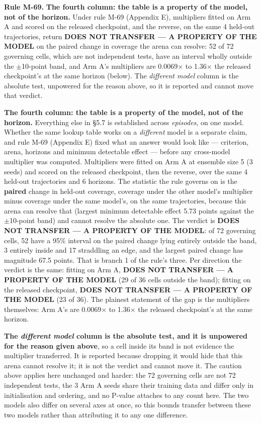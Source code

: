 \documentclass[10pt]{article}
\begin{document}
\textbf{Rule M-69.} \textbf{The fourth column: the table is a property of the model, not of the horizon.} Under rule M-69 (Appendix E), multipliers fitted on Arm A and scored on the released checkpoint, and the reverse, on the same 4 held-out trajectories, return \textbf{DOES NOT TRANSFER --- A PROPERTY OF THE MODEL} on the paired change in coverage the arena can resolve: 52 of 72 governing cells, which are not independent tests, have an interval wholly outside the $\pm$10-point band, and Arm A's multipliers are 0.0069$\times$ to 1.36$\times$ the released checkpoint's at the same horizon (below). The \emph{different model} column is the absolute test, unpowered for the reason above, so it is reported and cannot move that verdict.

\textbf{The fourth column: the table is a property of the model, not of the horizon.} Everything else in \S{}5.7 is established across \emph{episodes}, on one model. Whether the same lookup table works on a \emph{different} model is a separate claim, and rule M-69 (Appendix E) fixed what an answer would look like --- criterion, arena, horizons and minimum detectable effect --- before any cross-model multiplier was computed. Multipliers were fitted on Arm A at ensemble size 5 (3 seeds) and scored on the released checkpoint, then the reverse, over the same 4 held-out trajectories and 6 horizons. The statistic the rule governs on is the \textbf{paired} change in held-out coverage, coverage under the other model's multiplier minus coverage under the same model's, on the same trajectories, because this arena can resolve that (largest minimum detectable effect 5.73 points against the $\pm$10-point band) and cannot resolve the absolute one. The verdict is \textbf{DOES NOT TRANSFER --- A PROPERTY OF THE MODEL}: of 72 governing cells, 52 have a 95\% interval on the paired change lying entirely outside the band, 3 entirely inside and 17 straddling an edge, and the largest paired change has magnitude 67.5 points. That is branch 1 of the rule's three. Per direction the verdict is the same: fitting on Arm A, \textbf{DOES NOT TRANSFER --- A PROPERTY OF THE MODEL} (29 of 36 cells outside the band); fitting on the released checkpoint, \textbf{DOES NOT TRANSFER --- A PROPERTY OF THE MODEL} (23 of 36). The plainest statement of the gap is the multipliers themselves: Arm A's are 0.0069$\times$ to 1.36$\times$ the released checkpoint's at the same horizon.

\textbf{The \emph{different model} column is the absolute test, and it is unpowered for the reason given above}, so a cell inside its band is not evidence the multiplier transferred. It is reported because dropping it would hide that this arena cannot resolve it; it is not the verdict and cannot move it. The caution above applies here unchanged and harder: the 72 governing cells are not 72 independent tests, the 3 Arm A seeds share their training data and differ only in initialisation and ordering, and no P-value attaches to any count here. The two models also differ on several axes at once, so this bounds transfer between these two models rather than attributing it to any one difference.
\end{document}
